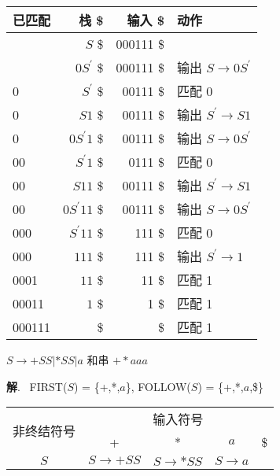 \documentclass[12pt,a4paper]{article}
\newenvironment{problems}{\begin{list}{}{\renewcommand{\makelabel}[1]{\textbf{##1}\hfil}}}{\end{list}}
\providecommand{\sol}{\textbf{解}.~}
\begin{document}
\begin{problems}
\begin{multicols}{2}
    \begin{tabular}{|lr<{\$}r<{\$}l|}
        \hline
        已匹配   & 栈 & 输入 & 动作 \\
        \hline
        & $S$ & 000111 & \\
        & $0S^\prime$ & 000111 & 输出 $S\rightarrow 0 S^\prime$\\
        0       & $S^\prime$ & 00111 & 匹配 0 \\
        0       & $S1$ & 00111 & 输出 $S^\prime \rightarrow S1$  \\
        0       & $0S^\prime 1$ & 00111 & 输出 $S\rightarrow 0 S^\prime$  \\
        00      & $S^\prime 1$ & 0111 & 匹配 0  \\
        00      & $S11$ & 00111 & 输出 $S^\prime \rightarrow S1$  \\
        00      & $0S^\prime 11$ & 00111 & 输出 $S\rightarrow 0 S^\prime$  \\
        000     & $S^\prime 11$ & 111 & 匹配 0  \\
        000     & $111$ & 111 & 输出  $S^\prime \rightarrow 1$  \\
        0001    & $11$ & 11 & 匹配 1  \\
        00011    & $1$ & 1 & 匹配 1  \\
        000111    &  &  & 匹配 1  \\
        \hline
    \end{tabular}
    \end{multicols}
    \item[2)] $S\rightarrow + S S | * S S | a$ 和串 $+*aaa$
    
    
        \sol
        FIRST($S$) = \{+,*,$a$\}, FOLLOW($S$) = \{+,*,$a$,\$\}
    
        \begin{tabular}{|c|c|c|c|c|}
            \hline
            \multirow{2}{*}{非终结符号} & \multicolumn{4}{c|}{输入符号} \\
            \cline{2-5}
                             & +      & *      & $a$ & \$     \\
            \hline
            $S$     & $S\rightarrow +SS$  & $S\rightarrow *SS$      &   $S\rightarrow a$& \\
            \hline
        \end{tabular}
    

\end{problems}
\end{document}
